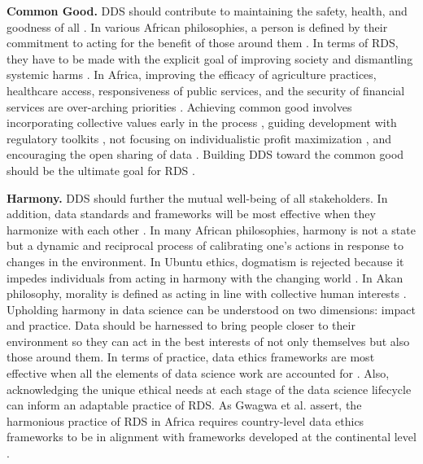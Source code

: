 \textbf{Common Good.}
DDS should contribute to maintaining the safety, health, and goodness of all \cite{olojede2023towards}.
In various African philosophies, a person is defined by their commitment to acting for the benefit of those around them \cite{african_union2024continental, nwankwo2019africa, mhlambi2023decolonizing,coetzee2004particularity,ruttkampbloem2023epistemic, gyekye2004person,abdul2023transhumanism, wiredu2004moralfoundations}. 
In terms of RDS, they have to be made with the explicit goal of improving society and dismantling systemic harms \cite{sinha2023principlesafrofeminist, okolo2023responsible, eke2023towards}.  
In Africa, improving the efficacy of agriculture practices, healthcare access, responsiveness of public services, and the security of financial services are over-arching priorities \cite{carman2023applying,kohnert2022machine}. Achieving common good involves incorporating collective values early in the process \cite{langat2020how,dignum2023responsible}, guiding development with regulatory toolkits \cite{olojede2023towards}, not focusing on individualistic profit maximization \cite{gwagwa2019recommendations,segun2021critically,mabe2007security,nyerere1962ujamaa, mhlambi2020from,dieng2023speaking}, and encouraging the open sharing of data \cite{gwagwa2019recommendations,abebe2021narratives,day2023data}. Building DDS toward the common good should be the ultimate goal for RDS \cite{carman2023applying, metz2021african, olojede2023towards, mabe2007security}. 

\textbf{Harmony.}
DDS should further the mutual well-being of all stakeholders. In addition, data standards and frameworks will be most effective when they harmonize with each other \cite{gwagwa2019recommendations, kiemde2022towards, wareham2021artificial, mabe2007security}.
In many African philosophies, harmony is not a state but a dynamic and reciprocal process of calibrating one's actions in response to changes in the environment. In Ubuntu ethics, dogmatism is rejected because it impedes individuals from acting in harmony with the changing world \cite{ramose2004ethicsofubuntu}. In Akan philosophy, morality is defined as acting in line with collective human interests \cite{wiredu2004moralfoundations}. 
Upholding harmony in data science can be understood on two dimensions: impact and practice. 
Data should be harnessed to bring people closer to their environment so they can act in the best interests of not only themselves but also those around them. In terms of practice, data ethics frameworks are most effective when all the elements of data science work are accounted for \cite{kiemde2022towards,gwagwa2019recommendations}. Also, acknowledging the unique ethical needs at each stage of the data science lifecycle can inform an adaptable practice of RDS. As Gwagwa et al. assert, the harmonious practice of RDS in Africa requires country-level data ethics frameworks to be in alignment with frameworks developed at the continental level \cite{gwagwa2022role}. 
